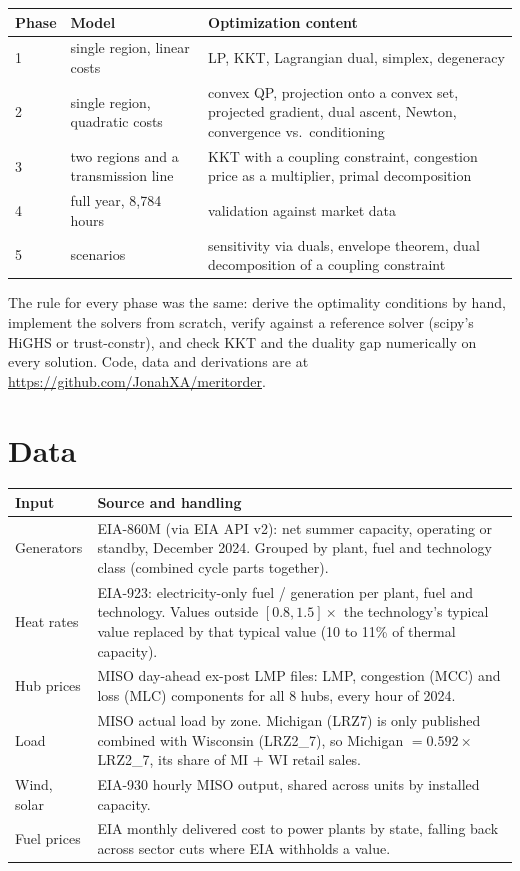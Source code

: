 \documentclass[11pt]{article}
\begin{document}
\begin{center}
\begin{tabularx}{\textwidth}{@{}l X X@{}}
\toprule
Phase & Model & Optimization content \\
\midrule
1 & single region, linear costs & LP, KKT, Lagrangian dual, simplex, degeneracy \\
2 & single region, quadratic costs & convex QP, projection onto a convex set, projected gradient, dual ascent, Newton, convergence vs.\ conditioning \\
3 & two regions and a transmission line & KKT with a coupling constraint, congestion price as a multiplier, primal decomposition \\
4 & full year, 8{,}784 hours & validation against market data \\
5 & scenarios & sensitivity via duals, envelope theorem, dual decomposition of a coupling constraint \\
\bottomrule
\end{tabularx}
\end{center}

The rule for every phase was the same: derive the optimality conditions by hand, implement the solvers from scratch, verify against a reference solver (scipy's HiGHS or trust-constr), and check KKT and the duality gap numerically on every solution. Code, data and derivations are at \url{https://github.com/JonahXA/meritorder}.

\section{Data}

\begin{center}
\begin{tabularx}{\textwidth}{@{}l X@{}}
\toprule
Input & Source and handling \\
\midrule
Generators & EIA-860M (via EIA API v2): net summer capacity, operating or standby, December 2024. Grouped by plant, fuel and technology class (combined cycle parts together). \\
Heat rates & EIA-923: electricity-only fuel / generation per plant, fuel and technology. Values outside $[0.8, 1.5]\times$ the technology's typical value replaced by that typical value (10 to 11\% of thermal capacity). \\
Hub prices & MISO day-ahead ex-post LMP files: LMP, congestion (MCC) and loss (MLC) components for all 8 hubs, every hour of 2024. \\
Load & MISO actual load by zone. Michigan (LRZ7) is only published combined with Wisconsin (LRZ2\_7), so Michigan $= 0.592 \times$ LRZ2\_7, its share of MI + WI retail sales. \\
Wind, solar & EIA-930 hourly MISO output, shared across units by installed capacity. \\
Fuel prices & EIA monthly delivered cost to power plants by state, falling back across sector cuts where EIA withholds a value. \\
\bottomrule
\end{tabularx}
\end{center}
\end{document}
